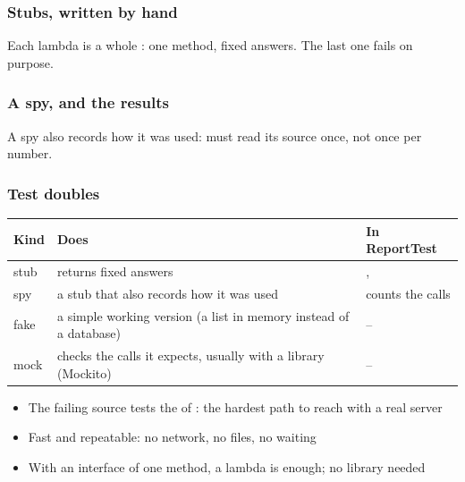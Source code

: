 \documentclass[aspectratio=169,10pt,compress]{beamer}
\begin{document}
\begin{frame}[t,fragile] \frametitle{Stubs, written by hand}

	\footnotesize Each lambda is a whole : one method, fixed answers. The last one fails on purpose.
\end{frame}




\begin{frame}[t,fragile] \frametitle{A spy, and the results}

	\footnotesize A spy also records how it was used:  must read its source once, not once per number.
\end{frame}




\begin{frame}[t,fragile] \frametitle{Test doubles}


\begin{table}
		\footnotesize
		\begin{tabular}{@{}L{0.12\textwidth}L{0.42\textwidth}L{0.38\textwidth}@{}}
			\toprule
			\textbf{Kind} & \textbf{Does} & \textbf{In ReportTest} \\
			\midrule
			stub  & returns fixed answers                           & ,  \\
			spy   & a stub that also records how it was used        &  counts the calls \\
			fake  & a simple working version (a list in memory instead of a database) & -- \\
			mock  & checks the calls it expects, usually with a library (Mockito) & -- \\
			\bottomrule
		\end{tabular}
\end{table}%


	\vspace{0.3em}
	\begin{itemize}\small
		\item The failing source tests the  of : the hardest path to reach with a real server
		\item Fast and repeatable: no network, no files, no waiting
		\item With an interface of one method, a lambda is enough; no library needed
	\end{itemize}
\end{frame}
\end{document}
